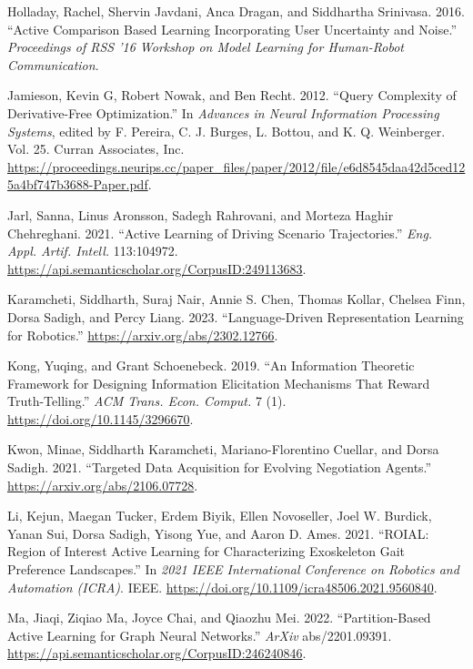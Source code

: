 \documentclass[
  letterpaper,
  DIV=11,
  numbers=noendperiod,
  oneside]{scrreprt}
\newlength{\cslhangindent}
\newenvironment{CSLReferences}[2] %
 {\begin{list}{}{%
  \setlength{\itemindent}{0pt}
  \setlength{\leftmargin}{0pt}
  \setlength{\parsep}{0pt}
  \ifodd #1
   \setlength{\leftmargin}{\cslhangindent}
   \setlength{\itemindent}{-1\cslhangindent}
  \fi
  \setlength{\itemsep}{#2\baselineskip}}}
 {\end{list}}
\theoremstyle{remark}
\begin{document}
\begin{CSLReferences}{1}{0}
Holladay, Rachel, Shervin Javdani, Anca Dragan, and Siddhartha
Srinivasa. 2016. {``Active Comparison Based Learning Incorporating User
Uncertainty and Noise.''} \emph{Proceedings of RSS '16 Workshop on Model
Learning for Human-Robot Communication}.

Jamieson, Kevin G, Robert Nowak, and Ben Recht. 2012. {``Query
Complexity of Derivative-Free Optimization.''} In \emph{Advances in
Neural Information Processing Systems}, edited by F. Pereira, C. J.
Burges, L. Bottou, and K. Q. Weinberger. Vol. 25. Curran Associates,
Inc.
\url{https://proceedings.neurips.cc/paper_files/paper/2012/file/e6d8545daa42d5ced125a4bf747b3688-Paper.pdf}.

Jarl, Sanna, Linus Aronsson, Sadegh Rahrovani, and Morteza Haghir
Chehreghani. 2021. {``Active Learning of Driving Scenario
Trajectories.''} \emph{Eng. Appl. Artif. Intell.} 113:104972.
\url{https://api.semanticscholar.org/CorpusID:249113683}.

Karamcheti, Siddharth, Suraj Nair, Annie S. Chen, Thomas Kollar, Chelsea
Finn, Dorsa Sadigh, and Percy Liang. 2023. {``Language-Driven
Representation Learning for Robotics.''}
\url{https://arxiv.org/abs/2302.12766}.

Kong, Yuqing, and Grant Schoenebeck. 2019. {``An Information Theoretic
Framework for Designing Information Elicitation Mechanisms That Reward
Truth-Telling.''} \emph{ACM Trans. Econ. Comput.} 7 (1).
\url{https://doi.org/10.1145/3296670}.

Kwon, Minae, Siddharth Karamcheti, Mariano-Florentino Cuellar, and Dorsa
Sadigh. 2021. {``Targeted Data Acquisition for Evolving Negotiation
Agents.''} \url{https://arxiv.org/abs/2106.07728}.

Li, Kejun, Maegan Tucker, Erdem Biyik, Ellen Novoseller, Joel W.
Burdick, Yanan Sui, Dorsa Sadigh, Yisong Yue, and Aaron D. Ames. 2021.
{``ROIAL: Region of Interest Active Learning for Characterizing
Exoskeleton Gait Preference Landscapes.''} In \emph{2021 IEEE
International Conference on Robotics and Automation (ICRA)}. IEEE.
\url{https://doi.org/10.1109/icra48506.2021.9560840}.

Ma, Jiaqi, Ziqiao Ma, Joyce Chai, and Qiaozhu Mei. 2022.
{``Partition-Based Active Learning for Graph Neural Networks.''}
\emph{ArXiv} abs/2201.09391.
\url{https://api.semanticscholar.org/CorpusID:246240846}.


\end{CSLReferences}
\end{document}
